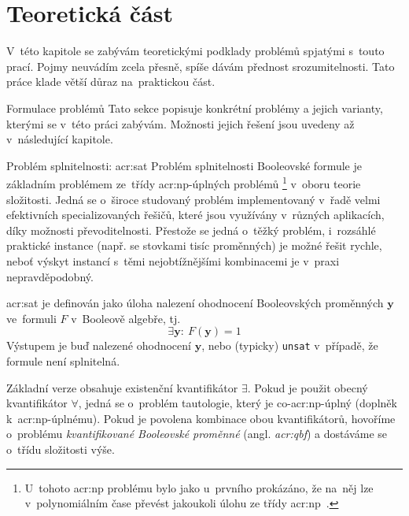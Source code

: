 \documentclass[thesis=M,czech]{FITthesis}[2012/06/26]
\newcommand{\acrlabel}[1]{acr:#1}
\newcommand{\acr}[1]{\acrshort{\acrlabel{#1}}}
\newcommand{\id}[1]{\texttt{#1}}
\newcommand{\hl}[1]{\textit{#1}}
\newcommand{\name}[1]{\hl{#1}}
\newcommand{\cit}[1]{\cite{#1}}
\renewcommand{\vec}[1]{\ensuremath{\boldsymbol{#1}}}
\begin{document}


\chapter{Teoretická část}\label{ch:theory}
V~této kapitole se zabývám
teoretickými podklady problémů spjatými s~touto prací.
Pojmy neuvádím zcela přesně,
spíše dávám přednost srozumitelnosti.
Tato práce klade větší důraz na~praktickou část.


\begin{section}{Formulace problémů}\label{s:theory:formulation}
Tato sekce popisuje konkrétní problémy a jejich varianty,
kterými se v~této práci zabývám.
Možnosti jejich řešení jsou uvedeny až v~následující kapitole.


\begin{subsection}{Problém splnitelnosti: \acr{sat}}
\label{ss:theory:formulation:sat}
Problém splnitelnosti Booleovské formule
je základním problémem
ze~třídy \acr{np}-úplných problémů%
\footnote{U~tohoto \acr{np} problému
bylo jako u~prvního prokázáno,
že na~něj lze v~polynomiálním čase převést
jakoukoli úlohu ze třídy \acr{np}~\cit{cook-art}.}
v~oboru teorie složitosti.
Jedná se o~široce studovaný problém
implementovaný v~řadě velmi efektivních specializovaných řešičů,
které jsou využívány v~různých aplikacích,
díky možnosti převoditelnosti.
Přestože se jedná o~těžký problém,
i~rozsáhlé praktické instance
(např. se stovkami tisíc proměnných)
je možné řešit rychle,
neboť výskyt instancí s~těmi nejobtížnějšími kombinacemi
je v~praxi nepravděpodobný.

\acr{sat} je definován jako úloha nalezení ohodnocení
Booleovských proměnných \vec{y}
ve~formuli $F$ v~Booleově algebře,
tj.
\begin{equation}\label{eq:sat}
   \exists \vec{y} : \: F(\vec{y}) = 1
\end{equation}
Výstupem je buď nalezené ohodnocení \vec{y},
nebo (typicky) \id{unsat} v~případě, že formule není splnitelná.

Základní verze obsahuje existenční kvantifikátor $\exists$.
Pokud je použit obecný kvantifikátor $\forall$,
jedná se o~problém tautologie, který je co-\acr{np}-úplný
(doplněk k~\acr{np}-úplnému).
Pokud je povolena kombinace obou kvantifikátorů,
hovoříme o~problému \name{kvantifikované Booleovské proměnné}
(angl. \name{\acr{qbf}})
a dostáváme se o~třídu složitosti výše.


\end{subsection}
\end{section}
\end{document}
